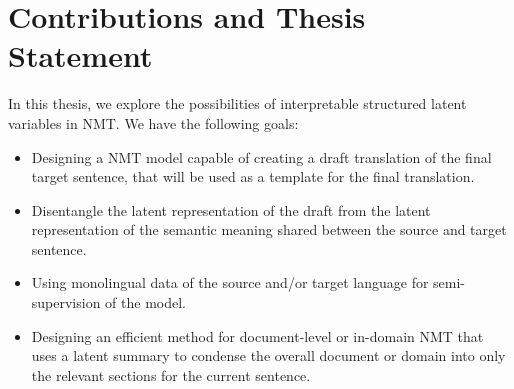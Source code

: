 \section{Contributions and Thesis Statement}
\label{sec:int_contributions}

In this thesis, we explore the possibilities
of interpretable structured latent variables
in NMT. We have the following goals:

\begin{itemize}
      \item Designing a NMT model capable of creating a
            draft translation of the final target sentence,
            that will be used as a template for the final translation.
      \item Disentangle the latent representation of the
            draft from the latent representation of the semantic meaning
            shared between the source and target sentence.
      \item Using monolingual data of the source and/or target language
            for semi-supervision of the model.
      \item Designing an efficient method for document-level or in-domain
            NMT that uses a latent summary to condense the overall document or domain
            into only the relevant sections for the current sentence.
\end{itemize}